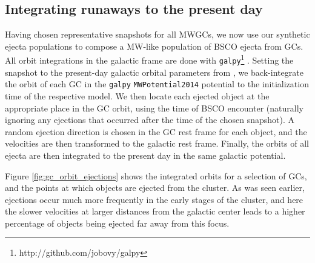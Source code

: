 \documentclass[twocolumn]{aastex631}
\begin{document}
\subsection{Integrating runaways to the present day} \label{subsec:galpy}

Having chosen representative snapshots for all MWGCs, we now use our synthetic ejecta populations to compose a MW-like population of BSCO ejecta from GCs.
All orbit integrations in the galactic frame are done with \texttt{galpy}\footnote{http://github.com/jobovy/galpy} \citep{2015ApJS..216...29B}.
Setting the snapshot to the present-day galactic orbital parameters from \citet{2018MNRAS.478.1520B}, we back-integrate the orbit of each GC in the \texttt{galpy} \texttt{MWPotential2014} potential to the initialization time of the respective model.
We then locate each ejected object at the appropriate place in the GC orbit, using the time of BSCO encounter (naturally ignoring any ejections that occurred after the time of the chosen snapshot).
A random ejection direction is chosen in the GC rest frame for each object, and the velocities are then transformed to the galactic rest frame.
Finally, the orbits of all ejecta are then integrated to the present day in the same galactic potential.

Figure \ref{fig:gc_orbit_ejections} shows the integrated orbits for a selection of GCs, and the points at which objects are ejected from the cluster.
As was seen earlier, ejections occur much more frequently in the early stages of the cluster, and here the slower velocities at larger distances from the galactic center leads to a higher percentage of objects being ejected far away from this focus.

\begin{figure*}
    \caption{
        Plots showing the back-integrated orbits for some sample MWGCs (gray curves), and the points in the orbit where an object is ejected from the GC (scatter points).
        The color scale communicates the mass of the ejected star.
        The concentration of ejections in the first few orbits is clear, and an increased density of ejections when clusters are farther away from the galactic center is visible as well.
        Viewing the figure electronically makes it easier to find the few high-mass ejecta amid the abundance of lower mass objects.
    }
    \label{fig:gc_orbit_ejections}
\end{figure*}
\end{document}
